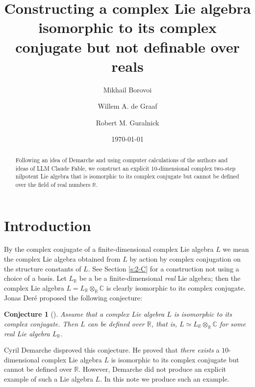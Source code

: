 \documentclass[11pt]{amsart}
\title[Complex Lie algebra isomorphic to its complex conjugate]
{Constructing a complex Lie algebra isomorphic to its complex conjugate but not definable over reals}
\author{Mikhail Borovoi}
\author{Willem A. de Graaf}
\author{Robert  M. Guralnick} %
\date\today
\theoremstyle{plain}
\newtheorem{conjecture}[theorem]{Conjecture}
\theoremstyle{definition}
\newcommand{\hs}{\kern 0.8pt}
\newcommand{\C}{{\mathds C}}
\newcommand{\R}{{\mathds R}}
\begin{document}
\begin{abstract}
Following an idea of Demarche and using computer calculations of the authors
and ideas of LLM Claude Fable,
we construct an explicit 10-dimensional complex two-step nilpotent Lie algebra
that is isomorphic to its complex conjugate
but cannot be defined over the field of real numbers $\R$.
\end{abstract}

\maketitle
\tableofcontents

\section{Introduction}
By the complex conjugate of a finite-dimensional complex Lie algebra $L$ we mean the complex Lie algebra obtained from $L$
by action by complex conjugation on the structure constants of $L$.
See Section \ref{s:2-C} for a construction not using a choice of a basis.
Let $L_\R$ be a be a finite-dimensional {\em real} Lie algebra; then the complex Lie algebra $L=L_\R\otimes_\R\C$
is clearly isomorphic to its complex conjugate.
Jonas Der\'e proposed the following conjecture:

\begin{conjecture}[{\cite[Conjecture 1 on page 494]{Dere}}]
\label{cj:Dere}
Assume that a complex Lie algebra $L$ is isomorphic to its complex conjugate. Then
$L$ can be defined over $\R$, that is, $L\simeq L_\R\otimes_\R\C$ for some real Lie algebra $L_\R$\hs.
\end{conjecture}

Cyril Demarche \cite[Theorem 1]{Demarche} disproved this conjecture.
He proved that {\em there exists} a $10$-dimensional complex Lie algebra $L$ is isomorphic to its complex conjugate
but cannot be defined over $\R$. However, Demarche did not produce an explicit example of such a Lie algebra $L$.
In this note we produce such an example.
\end{document}
